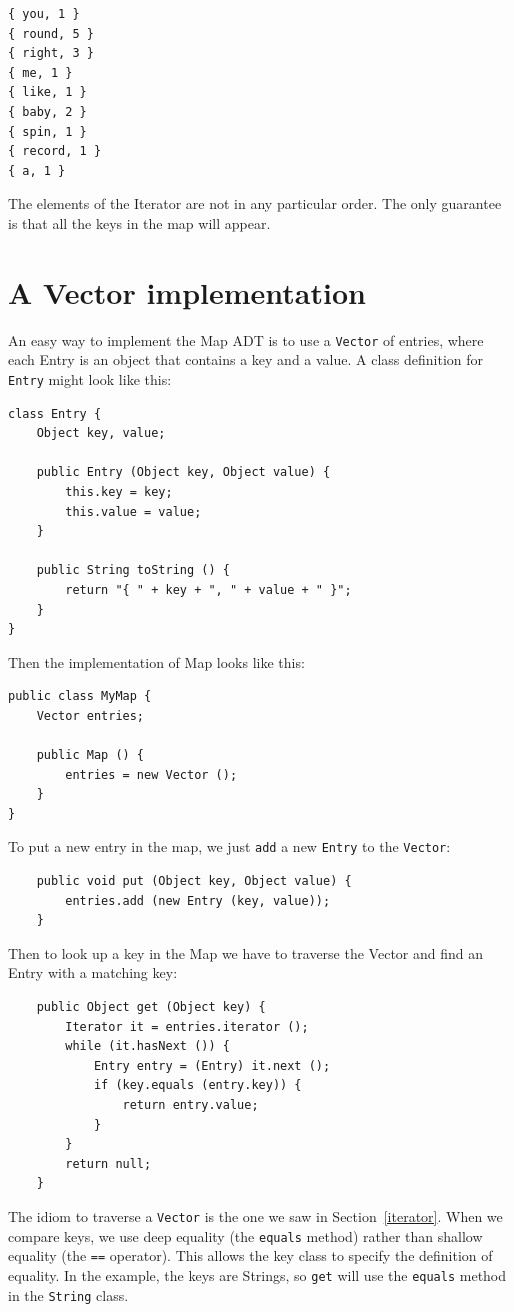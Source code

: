\documentclass[12pt]{book}
\theoremstyle{exercise}
\begin{document}
\begin{verbatim}
{ you, 1 }
{ round, 5 }
{ right, 3 }
{ me, 1 }
{ like, 1 }
{ baby, 2 }
{ spin, 1 }
{ record, 1 }
{ a, 1 }
\end{verbatim}
%
The elements of the Iterator are not in any particular order.
The only guarantee is that all the keys in the map will appear.


\section {A Vector implementation}

An easy way to implement the Map ADT is to use a {\tt Vector}
of entries, where each Entry is an object that contains a key
and a value.
A class definition for {\tt Entry} might look like
this:

\begin{verbatim}
class Entry {
    Object key, value;

    public Entry (Object key, Object value) {
        this.key = key;
        this.value = value;
    }

    public String toString () {
        return "{ " + key + ", " + value + " }";
    }
}
\end{verbatim}
%
Then the implementation of Map looks like this:

\begin{verbatim}
public class MyMap {
    Vector entries;

    public Map () {
        entries = new Vector ();
    }
}
\end{verbatim}

To put a new entry in the map, we just {\tt add} a new
{\tt Entry} to the {\tt Vector}:

\begin{verbatim}
    public void put (Object key, Object value) {
        entries.add (new Entry (key, value));
    }
\end{verbatim}

Then to look up a key in the Map we have to traverse the
Vector and find an Entry with a matching
key:

\begin{verbatim}
    public Object get (Object key) {
        Iterator it = entries.iterator ();
        while (it.hasNext ()) {
            Entry entry = (Entry) it.next ();
            if (key.equals (entry.key)) {
                return entry.value;
            }
        }
        return null;
    }
\end{verbatim}
%
The idiom to traverse a {\tt Vector} is the one we saw in
Section~\ref{iterator}.  When we compare keys, we use deep
equality (the {\tt equals} method) rather than shallow
equality (the {\tt ==} operator).  This allows the key class
to specify the definition of equality.  In the example, the
keys are Strings, so {\tt get} will use the {\tt equals}
method in the {\tt String} class.
\end{document}
